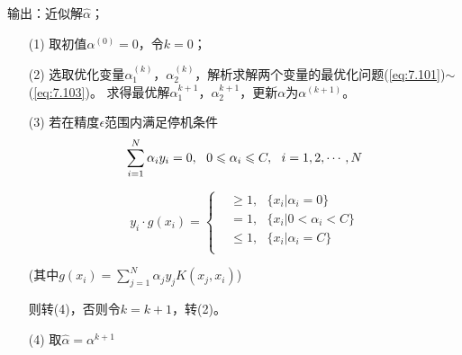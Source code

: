 输出：近似解$\hat{\alpha}$；

\begin{enumerate}[itemindent=2em]
    \item[(1)] 取初值$\alpha^{(0)}=0$，令$k=0$；
    \item[(2)] 选取优化变量$\alpha^{(k)}_1$，$\alpha^{(k)}_2$，解析求解两个变量的最优化问题(\ref{eq:7.101})$\sim$(\ref{eq:7.103})。
    求得最优解$\alpha^{k+1}_1$，$\alpha^{k+1}_2$，更新$\alpha$为$\alpha^{(k+1)}$。
    \item[(3)] 若在精度$\epsilon$范围内满足停机条件
    \begin{equation}
        \sum\limits_{i=1}^{N}\alpha_iy_i=0,\ \ 0\leqslant \alpha_i\leqslant C,\ \ i=1,2,\cdots,N\\
    \end{equation}

    \begin{equation}
        y_i\cdot g(x_i)=
        \begin{cases}
            & \geqslant 1, \ \ \ \{x_i|\alpha_i=0\}\\
            & = 1, \ \ \ \{x_i|0<\alpha_i<C\}\\
            & \leqslant 1, \ \ \ \{x_i|\alpha_i=C\}\\
        \end{cases}
    \end{equation}

    (其中$ g(x_i)=\sum\limits_{j=1}^{N}\alpha_jy_jK(x_j,x_i)$)

    则转(4)，否则令$k=k+1$，转(2)。

    \item[(4)] 取$\hat{\alpha}=\alpha^{k+1}$
\end{enumerate}